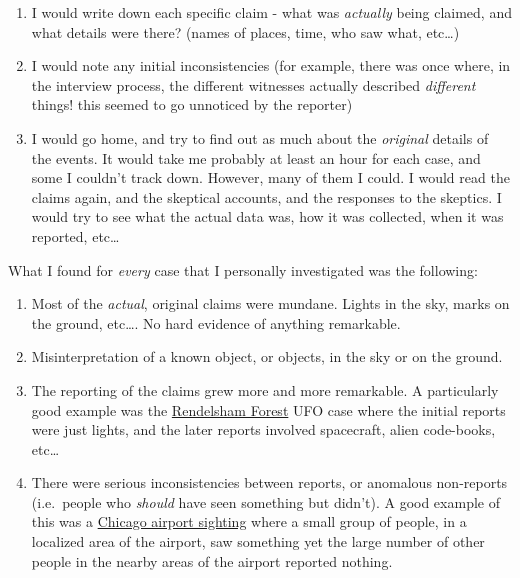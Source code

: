 \begin{enumerate}
\def\labelenumi{\arabic{enumi}.}
\itemsep1pt\parskip0pt
\item
  I would write down each specific claim - what was \emph{actually}
  being claimed, and what details were there? (names of places, time,
  who saw what, etc\ldots{})
\item
  I would note any initial inconsistencies (for example, there was once
  where, in the interview process, the different witnesses actually
  described \emph{different} things! this seemed to go unnoticed by the
  reporter)
\item
  I would go home, and try to find out as much about the \emph{original}
  details of the events. It would take me probably at least an hour for
  each case, and some I couldn't track down. However, many of them I
  could. I would read the claims again, and the skeptical accounts, and
  the responses to the skeptics. I would try to see what the actual data
  was, how it was collected, when it was reported, etc\ldots{}
\end{enumerate}

What I found for \emph{every} case that I personally investigated was
the following:

\begin{enumerate}
\def\labelenumi{\arabic{enumi}.}
\itemsep1pt\parskip0pt
\item
  Most of the \emph{actual}, original claims were mundane. Lights in the
  sky, marks on the ground, etc\ldots{}. No hard evidence of anything
  remarkable.
\item
  Misinterpretation of a known object, or objects, in the sky or on the
  ground.
\item
  The reporting of the claims grew more and more remarkable. A
  particularly good example was the
  \href{http://en.wikipedia.org/wiki/Rendlesham_Forest_incident}{Rendelsham
  Forest} UFO case where the initial reports were just lights, and the
  later reports involved spacecraft, alien code-books, etc\ldots{}
\item
  There were serious inconsistencies between reports, or anomalous
  non-reports (i.e.~people who \emph{should} have seen something but
  didn't). A good example of this was a
  \href{http://en.wikipedia.org/wiki/2006_O'Hare_International_Airport_UFO_sighting}{Chicago
  airport sighting} where a small group of people, in a localized area
  of the airport, saw something yet the large number of other people in
  the nearby areas of the airport reported nothing.
\end{enumerate}

